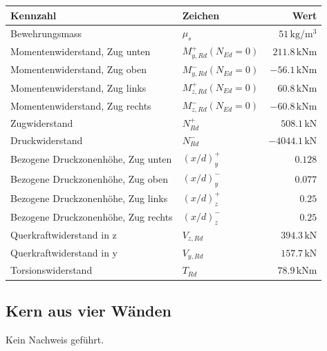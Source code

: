\documentclass[11pt,a4paper]{article}
\begin{document}
\begin{longtable}{llr}
\hline
Kennzahl & Zeichen & Wert \\
\hline
\endhead
Bewehrungsmass & $\mu_s$ & $51\,\mathrm{kg}/\mathrm{m}^{3}$ \\
Momentenwiderstand, Zug unten & $M_{y,Rd}^{+}(N_{Ed} = 0)$ & $211.8\,\mathrm{kNm}$ \\
Momentenwiderstand, Zug oben & $M_{y,Rd}^{-}(N_{Ed} = 0)$ & $-56.1\,\mathrm{kNm}$ \\
Momentenwiderstand, Zug links & $M_{z,Rd}^{+}(N_{Ed} = 0)$ & $60.8\,\mathrm{kNm}$ \\
Momentenwiderstand, Zug rechts & $M_{z,Rd}^{-}(N_{Ed} = 0)$ & $-60.8\,\mathrm{kNm}$ \\
Zugwiderstand & $N_{Rd}^{+}$ & $508.1\,\mathrm{kN}$ \\
Druckwiderstand & $N_{Rd}^{-}$ & $-4044.1\,\mathrm{kN}$ \\
Bezogene Druckzonenhöhe, Zug unten & $\left(x/d\right)_{y}^{+}$ & $0.128$ \\
Bezogene Druckzonenhöhe, Zug oben & $\left(x/d\right)_{y}^{-}$ & $0.077$ \\
Bezogene Druckzonenhöhe, Zug links & $\left(x/d\right)_{z}^{+}$ & $0.25$ \\
Bezogene Druckzonenhöhe, Zug rechts & $\left(x/d\right)_{z}^{-}$ & $0.25$ \\
Querkraftwiderstand in z & $V_{z,Rd}$ & $394.3\,\mathrm{kN}$ \\
Querkraftwiderstand in y & $V_{y,Rd}$ & $157.7\,\mathrm{kN}$ \\
Torsionswiderstand & $T_{Rd}$ & $78.9\,\mathrm{kNm}$ \\
\hline
\end{longtable}
\subsection{Kern aus vier Wänden}
Kein Nachweis geführt.
\end{document}
